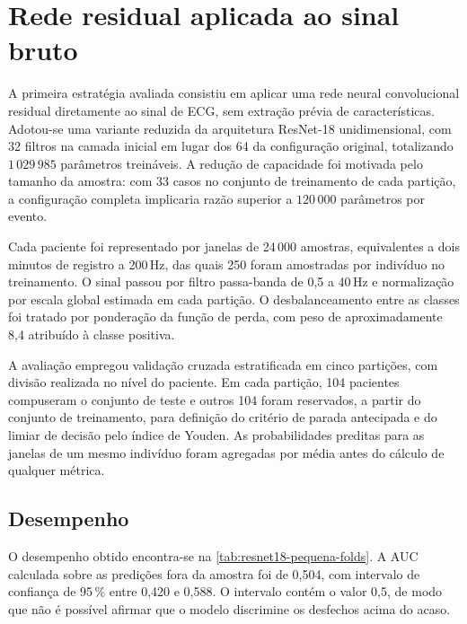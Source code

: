 
\section{Rede residual aplicada ao sinal bruto}
\label{sec:resultados-resnet18-pequena}

A primeira estratégia avaliada consistiu em aplicar uma rede neural
convolucional residual diretamente ao sinal de \gls{ECG}, sem extração prévia
de características. Adotou-se uma variante reduzida da arquitetura ResNet-18
unidimensional, com 32 filtros na camada inicial em lugar dos 64 da
configuração original, totalizando $1\,029\,985$ parâmetros treináveis. A
redução de capacidade foi motivada pelo tamanho da amostra: com 33 casos no
conjunto de treinamento de cada partição, a configuração completa implicaria
razão superior a $120\,000$ parâmetros por evento.

Cada paciente foi representado por janelas de 24\,000 amostras, equivalentes
a dois minutos de registro a 200\,Hz, das quais 250 foram amostradas por
indivíduo no treinamento. O sinal passou por filtro passa-banda de 0,5 a
40\,Hz e normalização por escala global estimada em cada partição. O
desbalanceamento entre as classes foi tratado por ponderação da função de
perda, com peso de aproximadamente 8,4 atribuído à classe positiva.

A avaliação empregou validação cruzada estratificada em cinco partições, com
divisão realizada no nível do paciente. Em cada partição, 104 pacientes
compuseram o conjunto de teste e outros 104 foram reservados, a partir do
conjunto de treinamento, para definição do critério de parada antecipada e do
limiar de decisão pelo índice de Youden. As probabilidades preditas para as
janelas de um mesmo indivíduo foram agregadas por média antes do cálculo de
qualquer métrica.

\subsection{Desempenho}
\label{subsec:desempenho-resnet18-pequena}

O desempenho obtido encontra-se na \autoref{tab:resnet18-pequena-folds}. A
\gls{AUC} calculada sobre as predições fora da amostra foi de 0,504, com
intervalo de confiança de 95\,\% entre 0,420 e 0,588. O intervalo contém o
valor 0,5, de modo que não é possível afirmar que o modelo discrimine os
desfechos acima do acaso.

